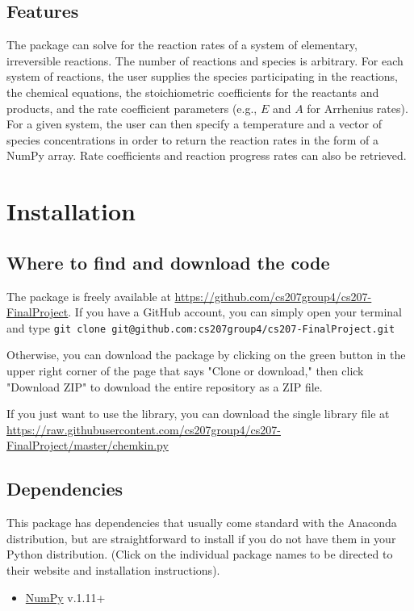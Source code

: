 \documentclass[12pt]{article}
\begin{document}
\subsection{Features}
The package can solve for the reaction rates of a system of elementary, irreversible reactions. The number of reactions and species is arbitrary. For each system of reactions, the user supplies the species participating in the reactions, the chemical equations, the stoichiometric coefficients for the reactants and products, and the rate coefficient parameters (e.g., $E$ and $A$ for Arrhenius rates). For a given system, the user can then specify a temperature and a vector of species concentrations in order to return the reaction rates in the form of a NumPy array. Rate coefficients and reaction progress rates can also be retrieved. 

\section{Installation}

\subsection{Where to find and download the code}
The package is freely available at \url{https://github.com/cs207group4/cs207-FinalProject}. If you have a GitHub account, you can simply open your terminal and type
\newline
{\tt git clone git@github.com:cs207group4/cs207-FinalProject.git} \newline

Otherwise, you can download the package by clicking on the green button in the upper right corner of the page that says "Clone or download," then click "Download ZIP" to download the entire repository as a ZIP file. \newline

If you just want to use the library, you can download the single library file at \url{https://raw.githubusercontent.com/cs207group4/cs207-FinalProject/master/chemkin.py}

\subsection{Dependencies}

This package has dependencies that usually come standard with the Anaconda distribution, but are straightforward to install if you do not have them in your Python distribution. (Click on the individual package names to be directed to their website and installation instructions).
\begin{itemize}
\item \href{http://www.numpy.org/}{NumPy} v.1.11+
\end{itemize}
\end{document}
